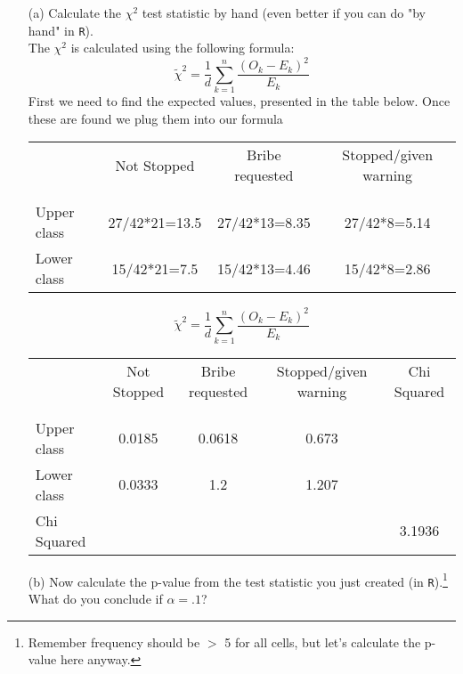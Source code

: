 \documentclass[12pt,letterpaper]{article}
\begin{document}
	\begin{enumerate}
		
		\item [(a)]
		Calculate the $\chi^2$ test statistic by hand (even better if you can do "by hand" in \texttt{R}).\\
		\vspace{0.5cm}
		The $\chi^2$ is calculated using the following formula:
		\vspace{0.5cm}
		\[\tilde{\chi}^2=\frac{1}{d}\sum_{k=1}^{n} \frac{(O_k - E_k)^2}{E_k}\]
		First we need to find the expected values, presented in the table below. Once these are found we plug them into our formula
		\vspace{0.5cm}
			\begin{table}[h!]
			\centering
			\begin{tabular}{l | c c c }
				& Not Stopped & Bribe requested & Stopped/given warning \\
				\\[-1.8ex] 
				\hline \\[-1.8ex]
				Upper class & 27/42*21=13.5 & 27/42*13=8.35 & 27/42*8=5.14 \\
				Lower class & 15/42*21=7.5 & 15/42*13=4.46 & 15/42*8=2.86 \\
				\hline
			\end{tabular}
		\end{table}
		\vspace{2cm}
			\[\tilde{\chi}^2=\frac{1}{d}\sum_{k=1}^{n} \frac{(O_k - E_k)^2}{E_k}\]
		\vspace{1cm}
			\begin{table}[h!]
			\centering
			\begin{tabular}{l | c c c c}
				& Not Stopped & Bribe requested & Stopped/given warning & Chi Squared \\
				\\[-1.8ex] 
				\hline \\[-1.8ex]
				Upper class & 0.0185 & 0.0618 & 0.673 &  \\
				Lower class & 0.0333  & 1.2 & 1.207 &  \\
				Chi Squared & & & & 3.1936 \\ 
				\hline
			\end{tabular}
		\end{table}
	\vspace{1cm}
		
		\item [(b)]
		Now calculate the p-value from the test statistic you just created (in \texttt{R}).\footnote{Remember frequency should be $>$ 5 for all cells, but let's calculate the p-value here anyway.}  What do you conclude if $\alpha = .1$?\\
		\vspace{0.5cm}
		

\end{enumerate}
\end{document}
